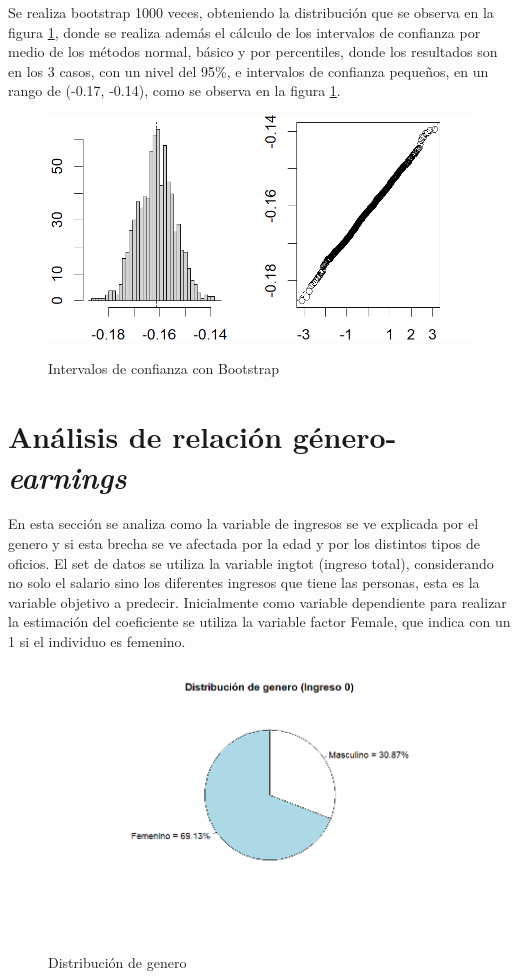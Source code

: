 \documentclass[11pt,a4paper]{article}
\begin{document}
Se realiza bootstrap 1000 veces, obteniendo la distribución que se observa en la figura \ref{fig:boostrap}, donde se realiza además el cálculo de los intervalos de confianza por medio de los métodos normal, básico y por percentiles, donde los resultados son en los 3 casos, con un nivel del 95\%, e intervalos de confianza pequeños, en un rango de (-0.17, -0.14), como se observa en la figura \ref{fig:boostrap}.

\begin{figure}[H]
    \centering
    \caption{Intervalos de confianza con Bootstrap}
    \includegraphics[width=\textwidth]{../views/bootstrap.png}
    \label{fig:boostrap}
\end{figure}
\section{Análisis de relación género-\emph{earnings}}

En esta sección se analiza como la variable de ingresos se ve explicada por el genero y si esta brecha se ve afectada por la edad y por los distintos tipos de oficios. El set de datos se utiliza la variable ingtot (ingreso total), considerando no solo el salario sino los diferentes ingresos que tiene las personas, esta es la variable objetivo a predecir. Inicialmente como variable dependiente para realizar la estimación del coeficiente se utiliza la variable factor Female, que indica con un 1 si el individuo es femenino.\\

\begin{figure}[H]
    \centering
    \caption{Distribución de genero}
    \includegraphics[width=\textwidth]{../views/ingreso_0.png}
    \label{fig:femenino}
\end{figure}
\end{document}
